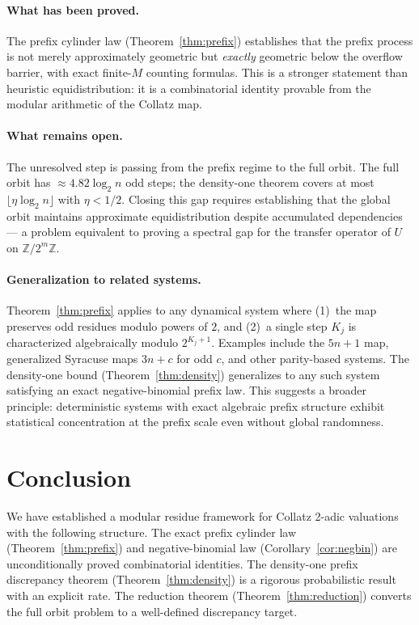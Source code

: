 \documentclass[12pt]{article}
\theoremstyle{definition}
\theoremstyle{remark}
\begin{document}
\paragraph{What has been proved.}
The prefix cylinder law (Theorem~\ref{thm:prefix}) establishes that
the prefix process is not merely approximately geometric but
\emph{exactly} geometric below the overflow barrier, with exact
finite-$M$ counting formulas.
This is a stronger statement than heuristic equidistribution:
it is a combinatorial identity provable from the modular arithmetic
of the Collatz map.

\paragraph{What remains open.}
The unresolved step is passing from the prefix regime to the full orbit.
The full orbit has $\approx 4.82\log_2 n$ odd steps; the density-one
theorem covers at most $\lfloor\eta\log_2 n\rfloor$ with $\eta<1/2$.
Closing this gap requires establishing that the global orbit
maintains approximate equidistribution despite accumulated dependencies
--- a problem equivalent to proving a spectral gap for the transfer
operator of $U$ on $\mathbb{Z}/2^m\mathbb{Z}$.

\paragraph{Generalization to related systems.}
Theorem~\ref{thm:prefix} applies to any dynamical system where
(1)~the map preserves odd residues modulo powers of $2$, and
(2)~a single step $K_j$ is characterized algebraically modulo
$2^{K_j+1}$.
Examples include the $5n+1$ map, generalized Syracuse maps $3n+c$
for odd $c$, and other parity-based systems.
The density-one bound (Theorem~\ref{thm:density}) generalizes to
any such system satisfying an exact negative-binomial prefix law.
This suggests a broader principle: deterministic systems with exact
algebraic prefix structure exhibit statistical concentration at the
prefix scale even without global randomness.

\section{Conclusion}

We have established a modular residue framework for Collatz 2-adic
valuations with the following structure.
The exact prefix cylinder law (Theorem~\ref{thm:prefix}) and
negative-binomial law (Corollary~\ref{cor:negbin}) are unconditionally
proved combinatorial identities.
The density-one prefix discrepancy theorem (Theorem~\ref{thm:density})
is a rigorous probabilistic result with an explicit rate.
The reduction theorem (Theorem~\ref{thm:reduction}) converts
the full orbit problem to a well-defined discrepancy target.
\end{document}
